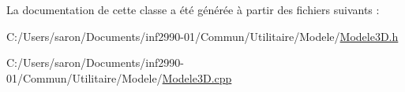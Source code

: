 La documentation de cette classe a été générée à partir des fichiers suivants \-:\begin{DoxyCompactItemize}
\item 
C\-:/\-Users/saron/\-Documents/inf2990-\/01/\-Commun/\-Utilitaire/\-Modele/\hyperlink{_modele3_d_8h}{Modele3\-D.\-h}\item 
C\-:/\-Users/saron/\-Documents/inf2990-\/01/\-Commun/\-Utilitaire/\-Modele/\hyperlink{_modele3_d_8cpp}{Modele3\-D.\-cpp}\end{DoxyCompactItemize}
